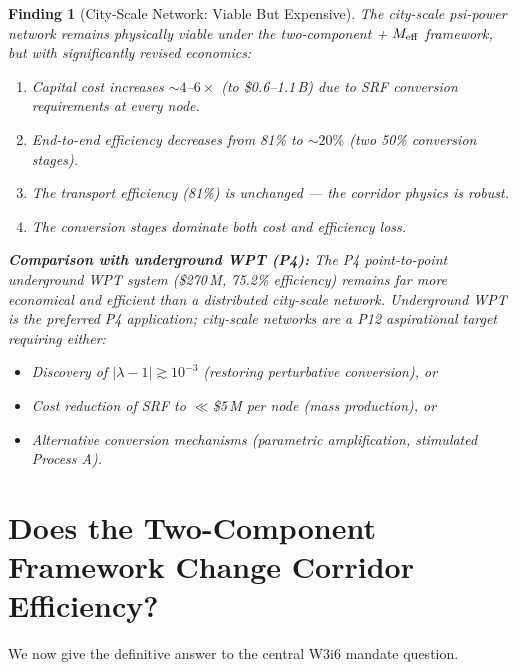 \documentclass[11pt]{article}
\newtheorem{finding}{Finding}
\newcommand{\Meff}{M_{\rm eff}}
\newcommand{\lambdaone}{|\lambda{-}1|}
\begin{document}
\begin{finding}[City-Scale Network: Viable But Expensive]
\label{find:city-network}
The city-scale psi-power network remains physically viable under the
two-component + $\Meff$ framework, but with significantly revised
economics:
\begin{enumerate}[nosep]
  \item Capital cost increases $\sim 4$--$6\times$ (to \$0.6--1.1\,B)
    due to SRF conversion requirements at every node.
  \item End-to-end efficiency decreases from 81\% to $\sim 20\%$
    (two 50\% conversion stages).
  \item The transport efficiency (81\%) is unchanged ---
    the corridor physics is robust.
  \item The conversion stages dominate both cost and efficiency loss.
\end{enumerate}

\textbf{Comparison with underground WPT (P4):} The P4 point-to-point
underground WPT system (\$270\,M, 75.2\% efficiency) remains far more
economical and efficient than a distributed city-scale network.
Underground WPT is the preferred P4 application; city-scale networks
are a P12 aspirational target requiring either:
\begin{itemize}[nosep]
  \item Discovery of $\lambdaone \gtrsim 10^{-3}$ (restoring perturbative
    conversion), or
  \item Cost reduction of SRF to $\ll$\$5\,M per node (mass production), or
  \item Alternative conversion mechanisms (parametric amplification,
    stimulated Process A).
\end{itemize}
\end{finding}

\section{Does the Two-Component Framework Change Corridor Efficiency?}
\label{sec:corridor-efficiency}

We now give the definitive answer to the central W3i6 mandate question.
\end{document}
